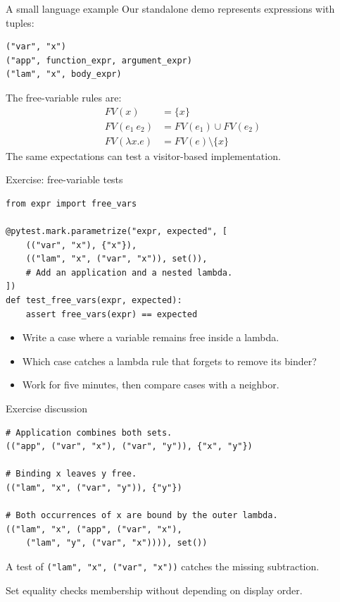 \documentclass[aspectratio=169,11pt]{beamer}
\newcommand{\code}[1]{\texttt{#1}}
\begin{document}
\begin{frame}[fragile]{A small language example}
Our standalone demo represents expressions with tuples:
\begin{lstlisting}
("var", "x")
("app", function_expr, argument_expr)
("lam", "x", body_expr)
\end{lstlisting}
The free-variable rules are:
\[
\begin{aligned}
FV(x) &= \{x\} \\
FV(e_1\ e_2) &= FV(e_1) \cup FV(e_2) \\
FV(\lambda x.e) &= FV(e) \setminus \{x\}
\end{aligned}
\]
The same expectations can test a visitor-based implementation.
\end{frame}

\begin{frame}[fragile]{Exercise: free-variable tests}
\begin{lstlisting}
from expr import free_vars

@pytest.mark.parametrize("expr, expected", [
    (("var", "x"), {"x"}),
    (("lam", "x", ("var", "x")), set()),
    # Add an application and a nested lambda.
])
def test_free_vars(expr, expected):
    assert free_vars(expr) == expected
\end{lstlisting}
\begin{itemize}
\item Write a case where a variable remains free inside a lambda.
\item Which case catches a lambda rule that forgets to remove its binder?
\item Work for five minutes, then compare cases with a neighbor.
\end{itemize}
\end{frame}

\begin{frame}[fragile]{Exercise discussion}
\begin{lstlisting}
# Application combines both sets.
(("app", ("var", "x"), ("var", "y")), {"x", "y"})

# Binding x leaves y free.
(("lam", "x", ("var", "y")), {"y"})

# Both occurrences of x are bound by the outer lambda.
(("lam", "x", ("app", ("var", "x"),
    ("lam", "y", ("var", "x")))), set())
\end{lstlisting}
A test of \code{("lam", "x", ("var", "x"))} catches the missing subtraction.

Set equality checks membership without depending on display order.
\end{frame}
\end{document}
